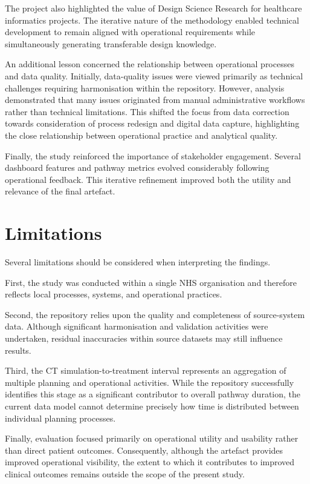 The project also highlighted the value of Design Science Research for healthcare informatics projects. The iterative nature of the methodology enabled technical development to remain aligned with operational requirements while simultaneously generating transferable design knowledge. 

An additional lesson concerned the relationship between operational processes and data quality. Initially, data-quality issues were viewed primarily as technical challenges requiring harmonisation within the repository. However, analysis demonstrated that many issues originated from manual administrative workflows rather than technical limitations. This shifted the focus from data correction towards consideration of process redesign and digital data capture, highlighting the close relationship between operational practice and analytical quality.

Finally, the study reinforced the importance of stakeholder engagement. Several dashboard features and pathway metrics evolved considerably following operational feedback. This iterative refinement improved both the utility and relevance of the final artefact.

\section{Limitations}

Several limitations should be considered when interpreting the findings. 

First, the study was conducted within a single NHS organisation and therefore reflects local processes, systems, and operational practices. 

Second, the repository relies upon the quality and completeness of source-system data. Although significant harmonisation and validation activities were undertaken, residual inaccuracies within source datasets may still influence results. 

Third, the CT simulation-to-treatment interval represents an aggregation of multiple planning and operational activities. While the repository successfully identifies this stage as a significant contributor to overall pathway duration, the current data model cannot determine precisely how time is distributed between individual planning processes. 

Finally, evaluation focused primarily on operational utility and usability rather than direct patient outcomes. Consequently, although the artefact provides improved operational visibility, the extent to which it contributes to improved clinical outcomes remains outside the scope of the present study.

